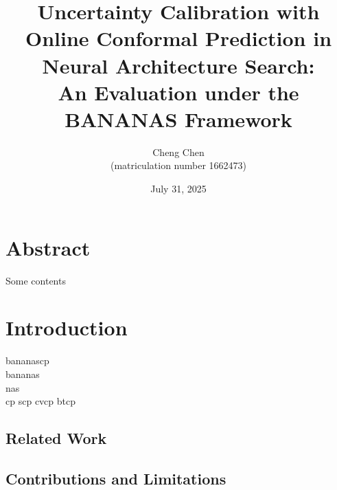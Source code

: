 \documentclass[a4paper,oneside,bibliography=totoc]{scrbook}
\begin{document}
\setlength{\skip\footins}{20pt}
\frontmatter \subject{Master Thesis} %
\title{\LARGE 
	Uncertainty Calibration with Online Conformal Prediction in Neural Architecture Search: \\ 
	An Evaluation under the BANANAS Framework 
}
\author{
	Cheng Chen\\ (matriculation number 1662473)} \date{July 31, 2025
}
\publishers{
	{\small Submitted to}\\
	Data and Web Science Group\\Prof.\ Dr.\ Margret Keuper\\University of Mannheim\\
}
\maketitle

\chapter{Abstract}
Some contents


\begingroup%
\hypersetup{hidelinks} %
\tableofcontents%
\endgroup


\mainmatter  %

\chapter{Introduction}
\gls{bananascp} \\
\gls{bananas} \\
\gls{nas} \\
\gls{cp}
\gls{scp}
\gls{cvcp}
\gls{btcp} 

\label{ch:intro}

\section{Related Work}
\section{Contributions and Limitations}
\end{document}
